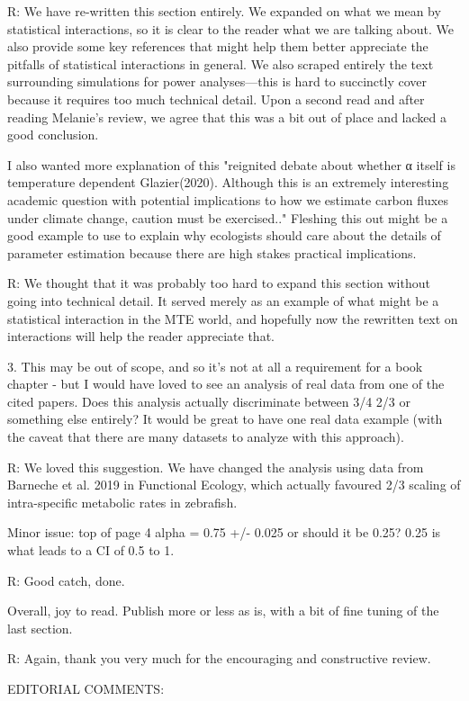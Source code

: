 R: We have re-written this section entirely. We expanded on what we mean by statistical interactions, so it is clear to the reader what we are talking about. We also provide some key references that might help them better appreciate the pitfalls of statistical interactions in general. We also scraped entirely the text surrounding simulations for power analyses---this is hard to succinctly cover because it requires too much technical detail. Upon a second read and after reading Melanie's review, we agree that this was a bit out of place and lacked a good conclusion.

I also wanted more explanation of this "reignited debate about whether α itself is temperature dependent Glazier(2020). Although this is an extremely interesting academic question with potential implications to how we estimate carbon fluxes under climate change, caution must be exercised.." Fleshing this out might be a good example to use to explain why ecologists should care about the details of parameter estimation because there are high stakes practical implications.

R: We thought that it was probably too hard to expand this section without going into technical detail. It served merely as an example of what might be a statistical interaction in the MTE world, and hopefully now the rewritten text on interactions will help the reader appreciate that.

3. This may be out of scope, and so it's not at all a requirement for a book chapter - but I would have loved to see an analysis of real data from one of the cited papers. Does this analysis actually discriminate between 3/4 2/3 or something else entirely? It would be great to have one real data example (with the caveat that there are many datasets to analyze with this approach).

R: We loved this suggestion. We have changed the analysis using data from Barneche et al. 2019 in Functional Ecology, which actually favoured 2/3 scaling of intra-specific metabolic rates in zebrafish.

Minor issue: top of page 4 alpha = 0.75 +/- 0.025 or should it be 0.25? 0.25 is what leads to a CI of 0.5 to 1.

R: Good catch, done.

Overall, joy to read. Publish more or less as is, with a bit of fine tuning of the last section.

R: Again, thank you very much for the encouraging and constructive review.

EDITORIAL COMMENTS:

